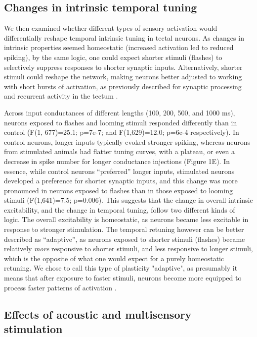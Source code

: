 \documentclass{article}
\begin{document}
\subsection*{Changes in intrinsic temporal tuning}

We then examined whether different types of sensory activation would differentially reshape temporal intrinsic tuning in tectal neurons. As changes in intrinsic properties seemed homeostatic (increased activation led to reduced spiking), by the same logic, one could expect shorter stimuli (flashes) to selectively suppress responses to shorter synaptic inputs. Alternatively, shorter stimuli could reshape the network, making neurons better adjusted to working with short bursts of activation, as  previously described for synaptic processing \citep{aizenman2007} and recurrent activity in the tectum \citep{pratt2007,shen2011}.

Across input conductances of different lengths (100, 200, 500, and 1000 ms), neurons exposed to flashes and looming stimuli responded differently than in control (F(1, 677)=25.1; p=7e-7; and F(1,629)=12.0; p=6e-4 respectively). In control neurons, longer inputs typically evoked stronger spiking, whereas neurons from stimulated animals had flatter tuning curves, with a plateau, or even a decrease in spike number for longer conductance injections (Figure 1E). In essence, while control neurons “preferred” longer inputs, stimulated neurons developed a preference for shorter synaptic inputs, and this change was more pronounced in neurons exposed to flashes than in those exposed to looming stimuli (F(1,641)=7.5; p=0.006). This suggests that the change in overall intrinsic excitability, and the change in temporal tuning, follow two different kinds of logic. The overall excitability is homeostatic, as neurons became less excitable in response to stronger stimulation. The temporal retuning however can be better described as “adaptive”, as neurons exposed to shorter stimuli (flashes) became relatively \textit{more} responsive to shorter stimuli, and less responsive to longer stimuli, which is the opposite of what one would expect for a purely homeostatic retuning. We chose to call this type of plasticity "adaptive", as presumably it means that after exposure to faster stimuli, neurons become more equipped to process faster patterns of activation \citep{stemmler1999information}.

\subsection*{Effects of acoustic and multisensory stimulation}
\end{document}
